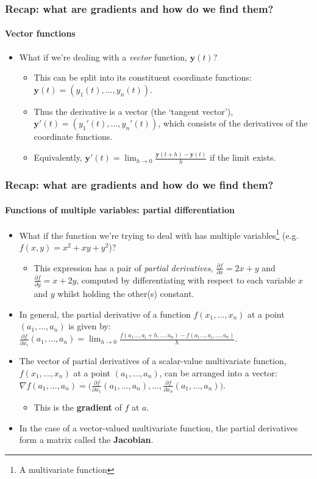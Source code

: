 \documentclass[\beamerclass]{beamer}
\begin{document}
\begin{frame}
\frametitle{Recap: what are gradients and how do we find them?}
\framesubtitle{Vector functions}
\begin{itemize}
	\item<+-> What if we're dealing with a \emph{vector} function, $\bm y(t)$?
	\begin{itemize}
		\item<+-> This can be split into its constituent coordinate functions: $\bm y(t) = (y_1(t),\dots,y_n(t))$.
		\item<+-> Thus the derivative is a vector (the `tangent vector'), $\bm y'(t)=(y_1'(t),\dots,y_n'(t))$, which consists of the derivatives of the coordinate functions.
		\item<+-> Equivalently, $\bm y'(t) = \lim_{h\to0} \frac{\bm y(t+h) - \bm y(t)}{h}$ if the limit exists.
	\end{itemize}
\end{itemize}
\end{frame}

\begin{frame}
\frametitle{Recap: what are gradients and how do we find them?}
\framesubtitle{Functions of multiple variables: partial differentiation}

\begin{itemize}
	\item What if the function we're trying to deal with has multiple variables\footnote{A multivariate function} (e.g. $f(x, y) = x^2 + xy + y^2$)?
	\begin{itemize}
		\item<+-> This expression has a pair of \emph{partial derivatives}, $\frac{\partial f}{\partial x} = 2x+y$ and $\frac{\partial f}{\partial y} = x + 2y$, computed by differentiating with respect to each variable $x$ and $y$ whilst holding the other(s) constant.
	\end{itemize}
	\item<+-> In general, the partial derivative of a function $f(x_1,\dots,x_n)$ at a point $(a_1,\dots,a_n)$ is given by: \\ $\frac{\partial f}{\partial x_i}(a_1,\dots,a_n) = \lim_{h\to0}\frac{f(a_1\dots,a_i+h,\dots,a_n)-f(a_1\dots,a_i,\dots,a_n)}{h}$.
	\item<+-> The vector of partial derivatives of a scalar-value multivariate function, $f(x_1,\dots,x_n)$ at a point $(a_1,\dots,a_n)$, can be arranged into a vector:
	$\nabla f(a_1,\dots,a_n) = \big(\frac{\partial f}{\partial x_1}(a_1,\dots,a_n), \dots, \frac{\partial f}{\partial x_n}(a_1,\dots,a_n) \big)$.
	\begin{itemize}
		\item<+-> This is the \textbf{gradient} of $f$ at $a$.
	\end{itemize}
	\item<+-> In the case of a vector-valued multivariate function, the partial derivatives form a matrix called the \textbf{Jacobian}.
\end{itemize}
\end{frame}
\end{document}
